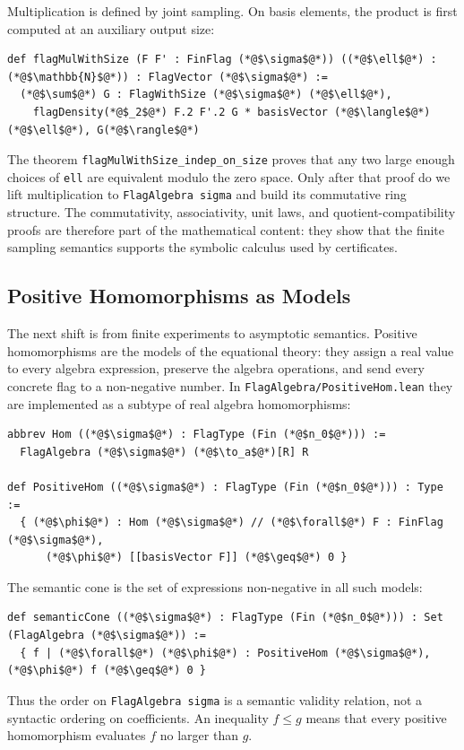 \documentclass{article}
\newcommand{\lean}[1]{\texttt{#1}}
\begin{document}
Multiplication is defined by joint sampling.  On basis elements, the product is
first computed at an auxiliary output size:
\begin{lstlisting}
def flagMulWithSize (F F' : FinFlag (*@$\sigma$@*)) ((*@$\ell$@*) : (*@$\mathbb{N}$@*)) : FlagVector (*@$\sigma$@*) :=
  (*@$\sum$@*) G : FlagWithSize (*@$\sigma$@*) (*@$\ell$@*),
    flagDensity(*@$_2$@*) F.2 F'.2 G * basisVector (*@$\langle$@*)(*@$\ell$@*), G(*@$\rangle$@*)
\end{lstlisting}
The theorem \lean{flagMulWithSize\_indep\_on\_size} proves that any two large
enough choices of \lean{ell} are equivalent modulo the zero space.  Only after
that proof do we lift multiplication to \lean{FlagAlgebra sigma} and build its
commutative ring structure.  The commutativity, associativity, unit laws, and
quotient-compatibility proofs are therefore part of the mathematical content:
they show that the finite sampling semantics supports the symbolic calculus
used by certificates.

\subsection{Positive Homomorphisms as Models}

The next shift is from finite experiments to asymptotic semantics.  Positive
homomorphisms are the models of the equational theory: they assign a real value
to every algebra expression, preserve the algebra operations, and send every
concrete flag to a non-negative number.  In
\lean{FlagAlgebra/PositiveHom.lean} they are implemented as a subtype of real
algebra homomorphisms:
\begin{lstlisting}
abbrev Hom ((*@$\sigma$@*) : FlagType (Fin (*@$n_0$@*))) :=
  FlagAlgebra (*@$\sigma$@*) (*@$\to_a$@*)[R] R

def PositiveHom ((*@$\sigma$@*) : FlagType (Fin (*@$n_0$@*))) : Type :=
  { (*@$\phi$@*) : Hom (*@$\sigma$@*) // (*@$\forall$@*) F : FinFlag (*@$\sigma$@*),
      (*@$\phi$@*) [[basisVector F]] (*@$\geq$@*) 0 }
\end{lstlisting}
The semantic cone is the set of expressions non-negative in all such models:
\begin{lstlisting}
def semanticCone ((*@$\sigma$@*) : FlagType (Fin (*@$n_0$@*))) : Set (FlagAlgebra (*@$\sigma$@*)) :=
  { f | (*@$\forall$@*) (*@$\phi$@*) : PositiveHom (*@$\sigma$@*), (*@$\phi$@*) f (*@$\geq$@*) 0 }
\end{lstlisting}
Thus the order on \lean{FlagAlgebra sigma} is a semantic validity relation, not
a syntactic ordering on coefficients.  An inequality $f\leq g$ means that
every positive homomorphism evaluates $f$ no larger than $g$.
\end{document}
